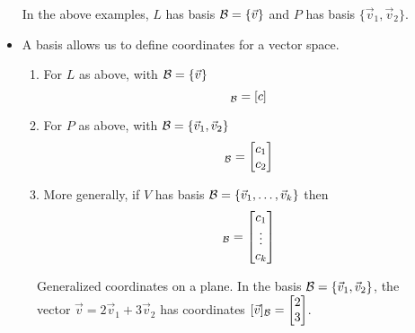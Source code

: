 \begin{itemize}
    In the above examples, $L$ has basis $\mathcal{B} = \{ \vec{v} \}$ and $P$ has basis $\{ \vec{v}_1, \vec{v}_2 \}$.

    \item A basis allows us to define coordinates for a vector space.
    \begin{enumerate}
      \item For $L$ as above, with $\mathcal{B} = \{ \vec{v} \}$
      \begin{equation*}
        [c\vec{v}]_{\calb} = [ c ]
      \end{equation*}
      \item For $P$ as above, with $\mathcal{B} = \{ \vec{v}_1, \vec{v}_2\}$
      \begin{equation*}
        [c_1 \vec{v}_1 + c_2 \vec{v}_2]_{\calb} = \begin{bmatrix}
          c_1 \\ c_2
        \end{bmatrix}
      \end{equation*}
      \item More generally, if $V$ has basis $\mathcal{B} = \{ \vec{v}_1, \dots, \vec{v}_k\}$ then
      \begin{equation*}
        [c_1 \vec{v}_1 + \dots + c_k \vec{v}_k]_{\calb} = \begin{bmatrix}
          c_1 \\ \vdots \\c_k
        \end{bmatrix}
      \end{equation*}
    \end{enumerate}
\end{itemize}

\begin{figure}
  \centering
  \caption{Generalized coordinates on a plane. In the basis $\mathcal{B}=\{ \vec{v}_1, \vec{v}_2 \}$, the vector $\vec{v} = 2 \vec{v}_1 + 3 \vec{v}_2$ has coordinates $[\vec{v}]_{\mathcal{B}} = \protect\begin{bmatrix} 2 \\ 3 \protect\end{bmatrix}$.}
\end{figure}
